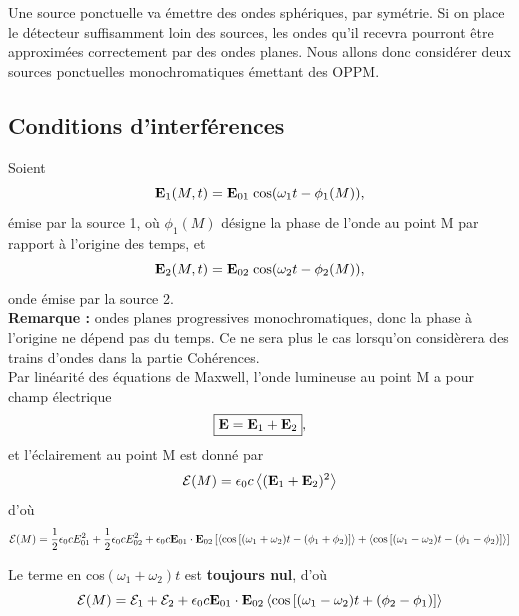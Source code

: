 \documentclass[11pt,a4paper]{report}
\begin{document}
Une source ponctuelle va émettre des ondes sphériques, par symétrie. Si on place le détecteur suffisamment loin des sources, les ondes qu'il recevra pourront être approximées correctement par des ondes planes. Nous allons donc considérer deux sources ponctuelles monochromatiques émettant des OPPM.

\subsection{Conditions d'interférences}

Soient
\begin{equation}
	\bold{E}_1(M,t) = \bold{E}_{01}\;\text{cos}(\omega_1 t - \phi_1(M)),
\end{equation}
émise par la source 1, où $\phi_1(M)$ désigne la phase de l'onde au point M par rapport à l'origine des temps, et
\begin{equation}
	\bold{E}_2(M,t) = \bold{E}_{02}\;\text{cos}(\omega_2 t - \phi_2(M)),
\end{equation}
onde émise par la source 2.\\

\textbf{Remarque :} ondes planes progressives monochromatiques, donc la phase à l'origine ne dépend pas du temps. Ce ne sera plus le cas lorsqu'on considèrera des trains d'ondes dans la partie Cohérences.\\

Par linéarité des équations de Maxwell, l'onde lumineuse au point M a pour champ électrique
\begin{equation}
	\boxed{\bold{E} = \bold{E}_1 + \bold{E}_2},
\end{equation}
et l'éclairement au point M est donné par
\begin{equation}
	\mathcal{E}(M) = \epsilon_0 c \left\langle (\bold{E}_1 + \bold{E}_2)^2 \right\rangle
\end{equation}
d'où
\begin{equation}
	\mathcal{E}(M) = \frac{1}{2}\epsilon_0 c E_{01}^2 + \frac{1}{2}\epsilon_0 c E_{02}^2
	+ \epsilon_0 c \bold{E}_{01}\cdot\bold{E}_{02}
	\left[
	\left\langle \text{cos}\left[(\omega_1 + \omega_2)t - (\phi_1 + \phi_2) \right]\right\rangle 	  + \left\langle \text{cos}\left[(\omega_1 - \omega_2)t - (\phi_1 - \phi_2) \right]\right\rangle
	\right]
\end{equation}

Le terme en cos$(\omega_1 + \omega_2)t$ est \textbf{toujours nul}, d'où
\begin{equation}
	\mathcal{E}(M) = \mathcal{E}_1 + \mathcal{E}_2 
	+ \epsilon_0 c \bold{E}_{01}\cdot\bold{E}_{02} 
	\left\langle \text{cos}\left[(\omega_1-\omega_2)t+(\phi_2-\phi_1)\right]\right\rangle
\end{equation}
\end{document}
